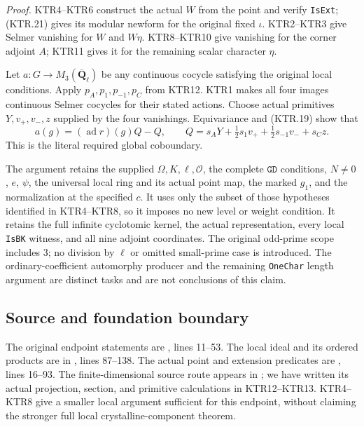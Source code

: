 \documentclass[11pt,a4paper]{article}
\numberwithin{equation}{section}
\theoremstyle{remark}\newtheorem{remark}[theorem]{Remark}
\begin{document}
\emph{Proof.}
KTR4--KTR6 construct the actual \(W\) from the point and
verify \texttt{Is\allowbreak Ext}; (KTR.21) gives its modular newform for
the original fixed \(\iota\).  KTR2--KTR3 give Selmer
vanishing for \(W\) and \(W\eta\).  KTR8--KTR10 give
vanishing for the corner adjoint \(A\); KTR11 gives it for
the remaining scalar character \(\eta\).

Let \(a:G\to M_3(\overline{\mathbf Q}_\ell)\) be any
continuous cocycle satisfying the original local conditions.
Apply \(p_A,p_1,p_{-1},p_C\) from KTR12.  KTR1 makes all
four images continuous Selmer cocycles for their stated actions.
Choose actual primitives \(Y,v_+,v_-,z\) supplied by the
four vanishings.  Equivariance and (KTR.19) show that
\[
 a(g)=(\operatorname{ad}r)(g)Q-Q,
 \qquad
 Q=s_A Y+\tfrac12s_1v_++\tfrac12s_{-1}v_-+s_Cz.
 \tag{KTR.22}
\]
This is the literal required global coboundary.

The argument retains the supplied \(\Omega,K,\ell,\mathcal O\),
the complete \(\texttt{GD}\) conditions, \(N\ne0\),
\(e\), \(\psi\), the universal local ring and its actual
point map, the marked \(g_1\), and the normalization at the
specified \(c\).  It uses only the subset of those hypotheses
identified in KTR4--KTR8, so it imposes no new level or weight
condition.  It retains the full infinite cyclotomic kernel,
the actual representation, every local \texttt{Is\allowbreak BK} witness,
and all nine adjoint coordinates.  The original odd-prime
scope includes \(3\); no division by \(\ell\) or omitted
small-prime case is introduced.  The ordinary-coefficient
automorphy producer and the remaining \texttt{One\allowbreak Char} length
argument are distinct tasks and are not conclusions of this
claim.

\subsection{Source and foundation boundary}

The original endpoint statements are
,
lines 11--53.  The local ideal and its ordered products are in
,
lines 87--138.  The actual point and extension predicates are
, lines 16--93.
The finite-dimensional source route appears in
;
we have written its actual projection, section, and primitive
calculations in KTR12--KTR13.  KTR4--KTR8 give a smaller local
argument sufficient for this endpoint, without claiming the
stronger full local crystalline-component theorem.
\end{document}
